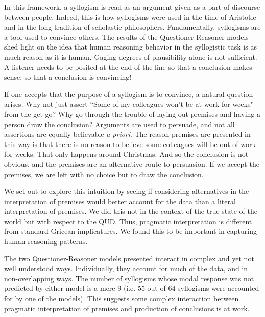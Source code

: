 \documentclass[10pt,letterpaper]{article}
\begin{document}
In this framework, a syllogism is read as an argument given as a part of discourse between people. Indeed, this is how syllogisms were used in the time of Aristotle and in the long tradition of scholastic philosophers. Fundamentally, syllogisms are a tool used to convince others. The results of the Questioner-Reasoner models shed light on the idea that human reasoning behavior in the syllogistic task is as much reason as it is human. Gaging degrees of plausibility alone is not sufficient. A listener needs to be posited at the end of the line so that a conclusion makes sense; so that a conclusion is convincing!

If one accepts that the purpose of a syllogism is to convince, a natural question arises. Why not just assert ``Some of my colleagues won't be at work for weeks" from the get-go? Why go through the trouble of laying out premises and having a person draw the conclusion? Arguments are used to persuade, and not all assertions are equally believable \emph{a priori}. The reason premises are presented in this way is that there is no reason to believe some  colleagues will be out of work for weeks. That only happens around Christmas. And so the conclusion is not obvious, and the premises are an alternative route to persuasion. If we accept the premises, we are left with no choice but to draw the conclusion.

We set out to explore this intuition by seeing if considering alternatives in the interpretation of premises would better account for the data than a literal interpretation of premises. We did this not in the context of the true state of the world but with respect to the QUD. Thus, pragmatic interpretation is different from standard Gricean implicatures. We found this to be important in capturing human reasoning patterns.

The two Questioner-Reasoner models presented interact in complex and yet not well understood ways. Individually, they account for much of the data, and in non-overlapping ways. The number of syllogisms whose modal response was not predicted by either model is a mere 9 (i.e. 55 out of 64 syllogisms were accounted for by one of the models). This suggests some complex interaction between pragmatic interpretation of premises and production of conclusions is at work. 


\end{document}

